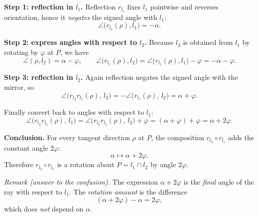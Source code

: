 \documentclass[12pt,a4paper]{article}
\theoremstyle{plain}
\theoremstyle{definition}      %
\begin{document}
\medskip
\noindent\textbf{Step 1: reflection in $l_1$.}
Reflection $r_{l_1}$ fixes $l_1$ pointwise and reverses orientation, hence it
\emph{negates} the signed angle with $l_1$:
\[
\angle\!\bigl(r_{l_1}(\rho),l_1\bigr)=-\alpha.
\]

\medskip
\noindent\textbf{Step 2: express angles with respect to $l_2$.}
Because $l_2$ is obtained from $l_1$ by rotating by $\varphi$ at $P$, we have
\[
\angle(\rho,l_2)=\alpha-\varphi,
\qquad
\angle\!\bigl(r_{l_1}(\rho),l_2\bigr)
=\angle\!\bigl(r_{l_1}(\rho),l_1\bigr)-\varphi
=-\alpha-\varphi.
\]

\medskip
\noindent\textbf{Step 3: reflection in $l_2$.}
Again reflection negates the signed angle with the mirror, so
\[
\angle\!\bigl(r_{l_2}r_{l_1}(\rho),\,l_2\bigr)
=
-\angle\!\bigl(r_{l_1}(\rho),\,l_2\bigr)
=
\alpha+\varphi.
\]

Finally convert back to angles with respect to $l_1$:
\[
\angle\!\bigl(r_{l_2}r_{l_1}(\rho),\,l_1\bigr)
=
\angle\!\bigl(r_{l_2}r_{l_1}(\rho),\,l_2\bigr)
+\varphi
=
(\alpha+\varphi)+\varphi
=
\alpha+2\varphi.
\]

\medskip
\noindent\textbf{Conclusion.}
For every tangent direction $\rho$ at $P$, the composition $r_{l_2}\circ r_{l_1}$
adds the constant angle $2\varphi$:
\[
\alpha \longmapsto \alpha+2\varphi.
\]
Therefore $r_{l_2}\circ r_{l_1}$ is a rotation about $P=l_1\cap l_2$ by angle $2\varphi$.

\medskip
\noindent\emph{Remark (answer to the confusion).}
The expression $\alpha+2\varphi$ is the \emph{final} angle of the ray with respect to $l_1$.
The \emph{rotation amount} is the difference
\[
(\alpha+2\varphi)-\alpha=2\varphi,
\]
which does \emph{not} depend on $\alpha$.







	
	
\end{document}
